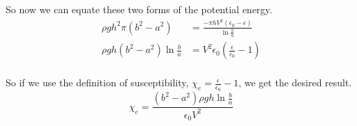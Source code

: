 \documentclass[10pt,a4paper]{article}
\begin{document}
So now we can equate these two forms of the potential energy.
\begin{align}
\rho gh^2 \pi (b^2-a^2)&=\frac{-\pi h V^2 (\epsilon_0-\epsilon)}{\ln\frac{b}{a}} \\
\rho gh (b^2-a^2) \ln\frac{b}{a}&= V^2 \epsilon_0 \left(\frac{\epsilon}{\epsilon_0}-1\right) \\
\end{align}

So if we use the definition of susceptibility, $\chi_e=\frac{\epsilon}{\epsilon_0}-1$, we get the desired result.
\begin{equation}\boxed{
\chi_e = \frac{(b^2-a^2) \rho gh \ln\frac{b}{a}}{\epsilon_0 V^2}
}\end{equation}
\end{document}
